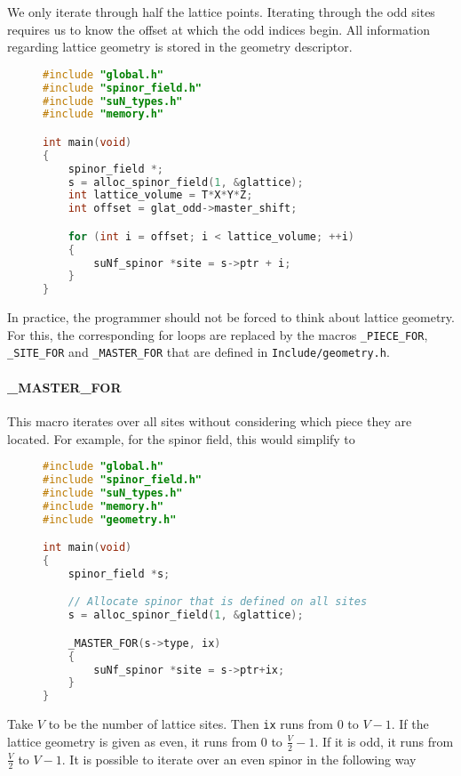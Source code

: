 \documentclass[12pt]{article}
\begin{document}
We only iterate through half the lattice points. Iterating through the odd sites requires us to know the offset at which the odd indices begin. All information regarding lattice geometry is stored in the geometry descriptor.

\begin{figure}[H]
\begin{lstlisting}[caption=CPU Iterate through odd sites,language=C]
#include "global.h"
#include "spinor_field.h"
#include "suN_types.h"
#include "memory.h"

int main(void)
{
    spinor_field *;
    s = alloc_spinor_field(1, &glattice);
    int lattice_volume = T*X*Y*Z;
    int offset = glat_odd->master_shift;

    for (int i = offset; i < lattice_volume; ++i)
    {
        suNf_spinor *site = s->ptr + i;
    }
}
\end{lstlisting}
\end{figure}

In practice, the programmer should not be forced to think about lattice geometry. For this, the corresponding for loops are replaced by the macros \texttt{\_PIECE\_FOR}, \texttt{\_SITE\_FOR} and \texttt{\_MASTER\_FOR} that are defined in \texttt{Include/geometry.h}.

\paragraph{\_MASTER\_FOR} This macro iterates over all sites without considering which piece they are located. For example, for the spinor field, this would simplify to

\begin{figure}[H]
\begin{lstlisting}[caption=Iterate over spinor field that is defined on all lattice sites,language=C]
#include "global.h"
#include "spinor_field.h"
#include "suN_types.h"
#include "memory.h"
#include "geometry.h"

int main(void)
{
    spinor_field *s;

    // Allocate spinor that is defined on all sites
    s = alloc_spinor_field(1, &glattice);

    _MASTER_FOR(s->type, ix)
    {
        suNf_spinor *site = s->ptr+ix;
    }
}
\end{lstlisting}
\end{figure}

Take $V$ to be the number of lattice sites. Then \texttt{ix} runs from 0 to $V-1$. If the lattice geometry is given as even, it runs from 0 to $\tfrac{V}{2}-1$. If it is odd, it runs from $\tfrac{V}{2}$ to $V-1$. It is possible to iterate over an even spinor in the following way
\end{document}
